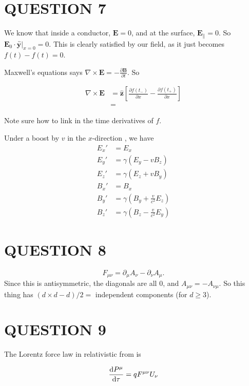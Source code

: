 \documentclass[a4paper]{article}
\begin{document}
\section{QUESTION 7}

We know that inside a conductor, $\mathbf{E} = 0$, and at the surface, $\mathbf{E}_{\parallel} = 0$. So $\mathbf{E}_0 \cdot \hat{\mathbf{y}}|_{x = 0} = 0$. This is clearly satisfied by our field, as it just becomes $ f(t) - f(t) = 0$. 


Maxwell's equations says $\nabla\times \mathbf{E} = -\frac{\partial \mathbf{B}}{\partial t}$. So

\begin{align*}
\nabla\times \mathbf{E} & = \hat{\mathbf{z}} \left[  \frac{\partial f(t_{-}) }{\partial x } - \frac{\partial f(t_{+}) }{\partial x } \right] \\
& =  
\end{align*}

Note sure how to link in the time derivatives of $ f $.

Under a boost by $v$ in the $x$-direction , we have
\begin{align*}
E_x' &= E_x\\
E_y' &= \gamma(E_y - vB_z)\\
E_z' &= \gamma(E_z + vB_y)\\
B_x' &= B_x\\
B_y' &= \gamma\left(B_y + \frac{v}{c^2}E_z\right)\\
B_z' &= \gamma\left(B_z - \frac{v}{c^2} E_y\right)
\end{align*}



\section{QUESTION 8}

\[
F_{\mu\nu} = \partial_\mu A_\nu -\partial_\nu A_\mu.
\]
Since this is antisymmetric, the diagonals are all 0, and $A_{\mu\nu} = -A_{\nu\mu}$. So this thing has $(d \times d - d)/2 = $ independent components (for $ d \geq 3 $).


\section{QUESTION 9}

The Lorentz force law in relativistic from is 

\[ \frac{\mathrm{d} P^{\mu}}{\mathrm{d} \tau} = q F^{\mu \nu} U_{\nu} \]
\end{document}
